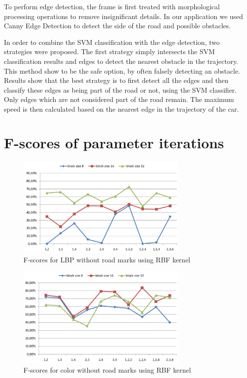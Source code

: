 \documentclass[runningheads,a4paper]{llncs}
\begin{document}
To perform edge detection, the frame is first treated with morphological processing operations to remove insignificant details. In our application we used Canny Edge Detection to detect the side of the road and possible obstacles.

In order to combine the SVM classification with the edge detection, two strategies were proposed. The first strategy simply intersects the SVM classification results and edges to detect the nearest obstacle in the trajectory. This method show to be the safe option, by often falsely detecting an obstacle.  Results show that the best strategy is to first detect all the edges and then classify these edges as being part of the road or not, using the SVM classifier. Only edges which are not considered part of the road remain. The maximum speed is then calculated based on the nearest edge in the trajectory of the car.

\newpage
{}


\newpage
\appendix
\section{F-scores of parameter iterations}
\label{appendix}

\begin{figure}
\centering
\includegraphics[width=0.75\textwidth]{fig/RBF-LBP-wo-RM.pdf}
\caption{F-scores for LBP without road marks using RBF kernel}
\end{figure}

\begin{figure}
\centering
\includegraphics[width=0.75\textwidth]{fig/RBF-COL-wo-RM.pdf}
\caption{F-scores for color without road marks using RBF kernel}
\end{figure}
\end{document}
